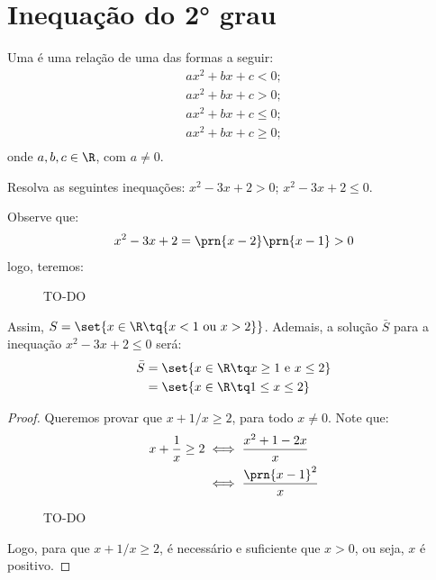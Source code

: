 \section{Inequação do 2° grau}

\begin{definition}
Uma  é uma relação de uma das formas
a seguir:
%
\begin{gather*}
ax^2 +bx + c <0;\\
ax^2 +bx + c>0;\\
ax^2 +bx + c \le 0;\\
ax^2 +bx + c \ge 0;\\
\end{gather*}
%
onde $a, b, c \in \R$, com $ a \ne 0$.
\end{definition}

\begin{example}
Resolva as seguintes inequações: $x^2 -3x +2 > 0$; $x^2 -3x +2 \le 0$.
\end{example}

\begin{solution}
Observe que: 
%
\begin{align*}
x^2-3x+2=\prn{x-2}\prn{x-1}>0
\end{align*}
%
\noindent logo, teremos:

\begin{figure}[H]
\caption{TO-DO}
\centering
\end{figure}

Assim, $S = \set{x \in \R \tq{x<1 \text{ ou } x>2}}$. Ademais, a solução $\bar{S}$ para a inequação $x^2-3x+2\le0$ será:
%
\begin{align*}
\bar{S} &= \set{x \in \R \tq x \ge 1 \text{ e } x \le 2} \\
		&= \set{x \in \R \tq 1 \le x \le 2} 
\end{align*}
\end{solution}

\begin{proof}
Queremos provar que $x+1/x\ge 2$, para todo $x \ne 0$. Note que:
%
\begin{align*}
x+\dfrac{1}{x}\ge 2 &\iff \dfrac{x^2+1-2x}{x} \\
		&\iff \dfrac{\prn{x-1}^2}{x}
\end{align*}

\begin{figure}[H]
\caption{TO-DO}
\centering
\end{figure}

Logo, para que $x+1/x\ge 2$, é necessário e suficiente que $x > 0$, ou seja, $x$ é positivo.
\end{proof}